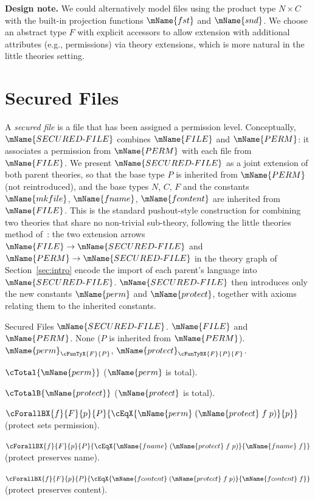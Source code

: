 \documentclass[11pt]{article}
\newcommand{\PERM}{\mName{PERM}}
\newcommand{\FILETYPE}{\mName{FILE}}
\newcommand{\SECFILE}{\mName{SECURED\text{-}FILE}}
\newcommand{\mkfile}{\mName{mkfile}}
\newcommand{\fname}{\mName{fname}}
\newcommand{\fcontent}{\mName{fcontent}}
\newcommand{\perm}{\mName{perm}}
\newcommand{\prot}{\mName{protect}}
\begin{document}
\medskip
\noindent\textbf{Design note.}
We could alternatively model files using the product type
$N \times C$ with the built-in projection functions $\mName{fst}$
and $\mName{snd}$.  We choose an abstract type $F$ with explicit
accessors to allow extension with additional attributes (e.g.,
permissions) via theory extensions, which is more natural in the
little theories setting.

\newpage
\section{Secured Files}
\label{sec:secfiles}

A \emph{secured file} is a file that has been assigned a permission
level.  Conceptually, $\SECFILE$ combines $\FILETYPE$ and $\PERM$:
it associates a permission from $\PERM$ with each file from
$\FILETYPE$.  We present $\SECFILE$ as a joint extension of both
parent theories, so that the base type $P$ is inherited from
$\PERM$ (not reintroduced), and the base types $N$, $C$, $F$ and
the constants $\mkfile$, $\fname$, $\fcontent$ are inherited from
$\FILETYPE$.  This is the standard pushout-style construction for
combining two theories that share no non-trivial sub-theory,
following the little theories method of~\cite{farmer2025}: the
two extension arrows $\FILETYPE \to \SECFILE$ and $\PERM \to
\SECFILE$ in the theory graph of Section~\ref{sec:intro} encode
the import of each parent's language into $\SECFILE$.  $\SECFILE$
then introduces only the new constants $\perm$ and $\prot$,
together with axioms relating them to the inherited constants.

\begin{theory-ext}
{Secured Files}
{$\SECFILE$.}
{$\FILETYPE$ and $\PERM$.}
{None ($P$ is inherited from $\PERM$).}
{$\perm_{\cFunTyX{F}{P}}$,\;
 $\prot_{\cFunTyBX{F}{P}{F}}$.}
{
\be \setcounter{enumi}{7}
\item $\cTotal{\perm}$
      \hfill ($\perm$ is total).

\item $\cTotalB{\prot}$
      \hfill ($\prot$ is total).

\item $\cForallBX{f}{F}{p}{P}{
      \cEqX{\perm\;(\prot\;f\;p)}{p}}$
      \hfill (protect sets permission).

\item $\cForallBX{f}{F}{p}{P}{
      \cEqX{\fname\;(\prot\;f\;p)}{\fname\;f}}$
      \hfill (protect preserves name).

\item $\cForallBX{f}{F}{p}{P}{
      \cEqX{\fcontent\;(\prot\;f\;p)}{\fcontent\;f}}$
      \hfill (protect preserves content).
\ee
}
\end{theory-ext}
\end{document}
